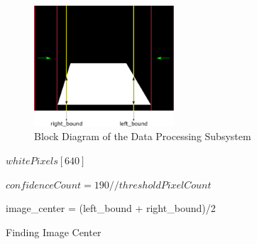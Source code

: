 \documentclass[a4paper,12pt]{article}
\begin{document}
\begin{enumerate}[A.]
\begin{figure}[h]
	
	\includegraphics[width=0.465\textwidth,center]{images/ROT_ROI/explanation_center_of_image}
	
	\caption{Block Diagram of the Data Processing Subsystem}\label{fig:dataProcessing_subsystem}
	
\end{figure}
\begin{algorithm}
	\DontPrintSemicolon
		$whitePixels[640]$\;

		$confidenceCount = 190 // threshold Pixel Count$\;

	
		

	image\_center = (left\_bound + right\_bound)/2
	

	\caption{Finding Image Center\label{algo:center_image}}
\end{algorithm}

\begin{figure}[t!]

\setlength{\unitlength}{\textwidth} 

\centering

\begin{subfigure}{.46\textwidth}

\centering


\end{subfigure}
\end{figure}
\end{enumerate}
\end{document}
